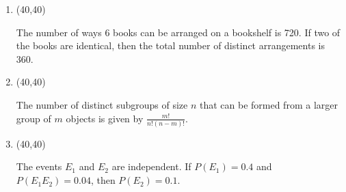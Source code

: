 \documentclass[11pt,twoside]{article}
\numberwithin{equation}{section}
\newcommand{\?}{\stackrel{?}{=}}
\newcommand{\fr}{\frac}
\newcommand{\gr}{\color{green!40!black}}
\begin{document}
\begin{enumerate}[\bf (i)]
  \smallskip
  \item \hfill
  \begin{minipage}{.1\linewidth}
    \framebox(40,40){\gr  }
  \end{minipage}\quad
  \begin{minipage}{.85\linewidth}
    The number of ways 6 books can be arranged on a bookshelf is 720. If two of the books are identical, then the total number of distinct arrangements is 360. %
  \end{minipage}
  
  \smallskip
  
\item \hfill
  \begin{minipage}{.1\linewidth}
    \framebox(40,40){\gr  }
  \end{minipage}\quad
  \begin{minipage}{.85\linewidth}
    The number of distinct subgroups of size $n$ that can be formed from a larger group of $m$ objects is given by $\fr{m!}{n!(n-m)!}$.
  \end{minipage}

  \smallskip

  \item \hfill
  \begin{minipage}{.1\linewidth}
    \framebox(40,40){\gr  }
  \end{minipage}\quad
  \begin{minipage}{.85\linewidth}
    The events $E_{1}$ and $E_{2}$ are independent. If $P(E_{1}) = 0.4$ and $P(E_{1}E_{2}) = 0.04$, then $P(E_{2}) = 0.1$.
  \end{minipage}
  \end{enumerate}

  
\end{document}

